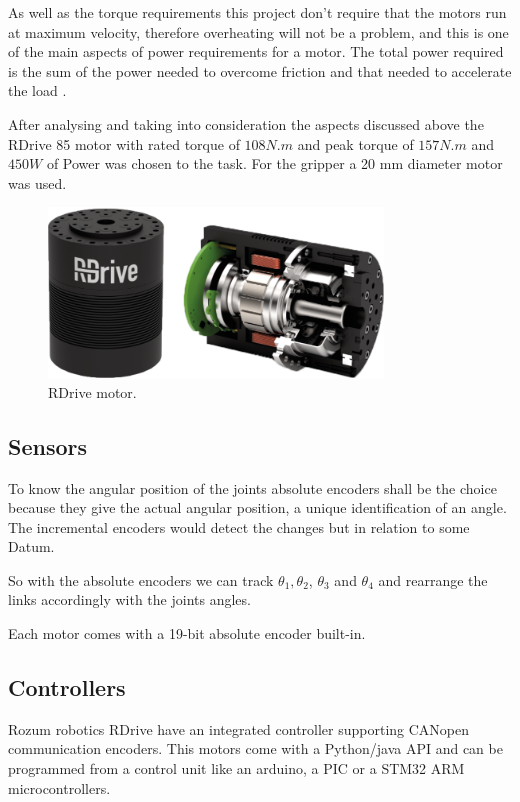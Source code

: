 \documentclass[transmag]{IEEEtran}
\begin{document}
As well as the torque requirements this project don't require that the motors run at maximum velocity, therefore overheating will not be a problem, and this is one of the main aspects of power requirements for a motor. The total power required is the sum of the power needed to overcome friction and that needed to accelerate the load \cite{ref4}.


After analysing and taking into consideration the aspects discussed above the RDrive 85 motor with rated torque of $108 N.m$ and peak torque of $157 N.m$ and $450W$ of Power was chosen to the task. \cite{ref8} For the gripper a 20 mm diameter motor was used.


 

\begin{figure}
\centerline{\includegraphics[width=3.5in]{./images/Motor}}
\caption{RDrive motor.\label{Motor}}
\end{figure}



\subsection{Sensors}

To know the angular position of the joints absolute encoders shall be the choice because they give the actual angular position, a unique identification of an angle. The incremental encoders would detect the changes but in relation to some Datum. \cite{ref3}

So with the absolute encoders we can track $\theta_1,\theta_2$, $\theta_3$ and $\theta_4$ and rearrange the links accordingly with the joints angles.

Each motor comes with a 19-bit absolute encoder built-in.


\subsection{Controllers}
Rozum robotics RDrive have an integrated controller supporting CANopen communication encoders.
This motors come with a Python/java API and can be programmed from a control unit like an arduino, a PIC or a STM32 ARM microcontrollers. 
\end{document}
